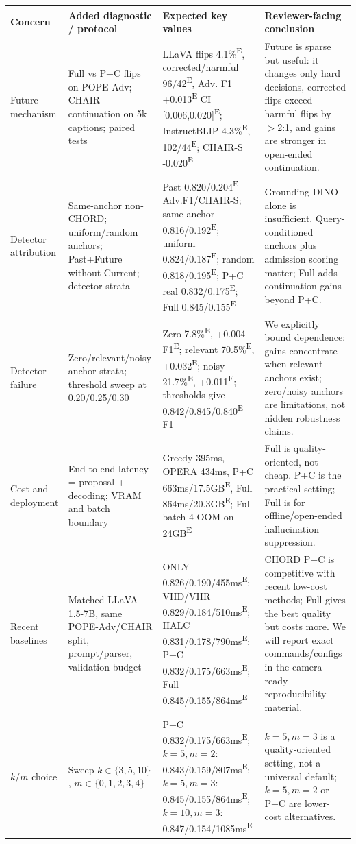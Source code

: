 \documentclass[9pt]{extarticle}
\newcommand{\E}{\textsuperscript{E}}
\newcommand{\head}[1]{\vspace{2pt}\noindent{\bfseries #1.}}
\begin{document}
\head{Core evidence to add}\par\vspace{-2pt}
\begin{tabularx}{\textwidth}{@{}P{0.145\textwidth}P{0.255\textwidth}P{0.265\textwidth}Y@{}}
\toprule
Concern & Added diagnostic / protocol & Expected key values & Reviewer-facing conclusion \\
\midrule
Future mechanism & Full vs P+C flips on POPE-Adv; CHAIR continuation on 5k captions; paired tests & LLaVA flips 4.1\%\E{}, corrected/harmful 96/42\E{}, Adv. F1 +0.013\E{} CI [0.006,0.020]\E{}; InstructBLIP 4.3\%\E{}, 102/44\E{}; CHAIR-S -0.020\E{} & Future is sparse but useful: it changes only hard decisions, corrected flips exceed harmful flips by $>$2:1, and gains are stronger in open-ended continuation. \\
Detector attribution & Same-anchor non-CHORD; uniform/random anchors; Past+Future without Current; detector strata & Past 0.820/0.204\E{} Adv.F1/CHAIR-S; same-anchor 0.816/0.192\E{}; uniform 0.824/0.187\E{}; random 0.818/0.195\E{}; P+C real 0.832/0.175\E{}; Full 0.845/0.155\E{} & Grounding DINO alone is insufficient. Query-conditioned anchors plus admission scoring matter; Full adds continuation gains beyond P+C. \\
Detector failure & Zero/relevant/noisy anchor strata; threshold sweep at 0.20/0.25/0.30 & Zero 7.8\%\E{}, +0.004 F1\E{}; relevant 70.5\%\E{}, +0.032\E{}; noisy 21.7\%\E{}, +0.011\E{}; thresholds give 0.842/0.845/0.840\E{} F1 & We explicitly bound dependence: gains concentrate when relevant anchors exist; zero/noisy anchors are limitations, not hidden robustness claims. \\
Cost and deployment & End-to-end latency = proposal + decoding; VRAM and batch boundary & Greedy 395ms, OPERA 434ms, P+C 663ms/17.5GB\E{}, Full 864ms/20.3GB\E{}; Full batch 4 OOM on 24GB\E{} & Full is quality-oriented, not cheap. P+C is the practical setting; Full is for offline/open-ended hallucination suppression. \\
Recent baselines & Matched LLaVA-1.5-7B, same POPE-Adv/CHAIR split, prompt/parser, validation budget & ONLY 0.826/0.190/455ms\E{}; VHD/VHR 0.829/0.184/510ms\E{}; HALC 0.831/0.178/790ms\E{}; P+C 0.832/0.175/663ms\E{}; Full 0.845/0.155/864ms\E{} & CHORD P+C is competitive with recent low-cost methods; Full gives the best quality but costs more. We will report exact commands/configs in the camera-ready reproducibility material. \\
$k/m$ choice & Sweep $k\in\{3,5,10\}$, $m\in\{0,1,2,3,4\}$ & P+C 0.832/0.175/663ms\E{}; $k=5,m=2$: 0.843/0.159/807ms\E{}; $k=5,m=3$: 0.845/0.155/864ms\E{}; $k=10,m=3$: 0.847/0.154/1085ms\E{} & $k=5,m=3$ is a quality-oriented setting, not a universal default; $k=5,m=2$ or P+C are lower-cost alternatives. \\

\end{tabularx}
\end{document}
